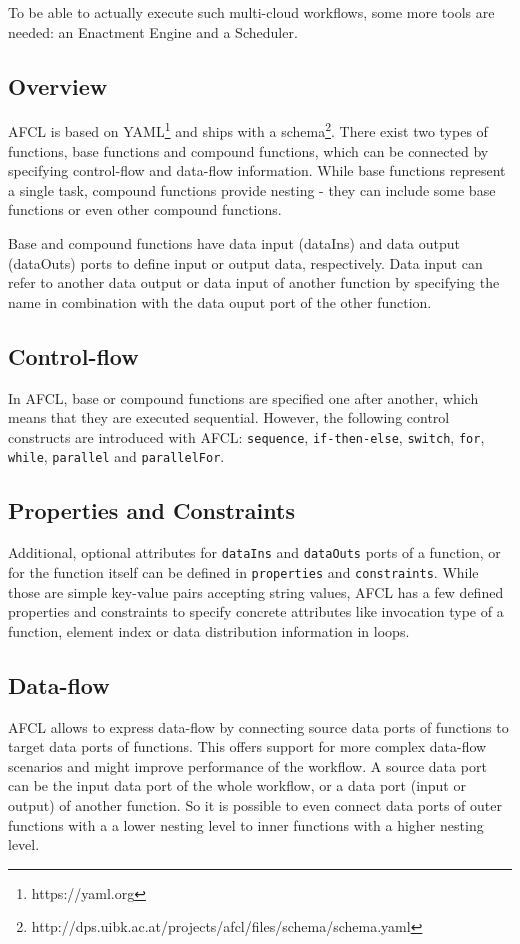 \documentclass[a4paper,12pt,pdftex,halfparskip,cleardoubleempty,bibtotoc,liststotoc]{scrbook}
\begin{document}
To be able to actually execute such multi-cloud workflows, some more tools are needed: an Enactment Engine and a Scheduler.

\subsection{Overview}
AFCL is based on YAML\footnote{https://yaml.org} and ships with a schema\footnote{http://dps.uibk.ac.at/projects/afcl/files/schema/schema.yaml}. There exist two types of functions, base functions and compound functions, which can be connected by specifying control-flow and data-flow information. While base functions represent a single task, compound functions provide nesting - they can include some base functions or even other compound functions.

Base and compound functions have data input (dataIns) and data output (dataOuts) ports to define input or output data, respectively.
Data input can refer to another data output or data input of another function by specifying the name in combination with the data ouput port of the other function.

\subsection{Control-flow}
In AFCL, base or compound functions are specified one after another, which means that they are executed sequential. However, the following control constructs are introduced with AFCL: \texttt{sequence}, \texttt{if-then-else}, \texttt{switch}, \texttt{for}, \texttt{while}, \texttt{parallel} and \texttt{parallelFor}.


\subsection{Properties and Constraints}

Additional, optional attributes for \texttt{dataIns} and \texttt{dataOuts} ports of a function, or for the function itself can be defined in \texttt{properties} and \texttt{constraints}. While those are simple key-value pairs accepting string values, AFCL has a few defined properties and constraints to specify concrete attributes like invocation type of a function, element index or data distribution information in loops.

\subsection{Data-flow}
AFCL allows to express data-flow by connecting source data ports of functions to target data ports of functions. This offers support for more complex data-flow scenarios and might improve performance of the workflow. A source data port can be the input data port of the whole workflow, or a data port (input or output) of another function. So it is possible to even connect data ports of outer functions with a a lower nesting level to inner functions with a higher nesting level. 
\end{document}
